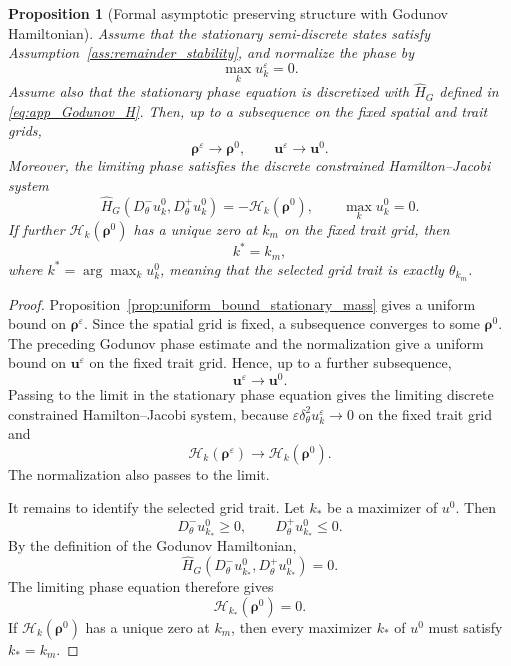 \documentclass[11pt]{article}
\newtheorem{proposition}{Proposition}[section]
\begin{document}
\begin{proposition}[Formal asymptotic preserving structure with Godunov Hamiltonian]
\label{prop:formal_asymptotic preserving_trait_selection}
Assume that the stationary semi-discrete states satisfy
Assumption~\ref{ass:remainder_stability}, and normalize the phase by
\[
    \max_k u_k^\varepsilon=0 .
\]
Assume also that the stationary phase equation is discretized with
\(\widehat H_G\) defined in \eqref{eq:app_Godunov_H}.  Then, up to a subsequence on
the fixed spatial and trait grids,
\[
    \boldsymbol\rho^\varepsilon\to \boldsymbol\rho^0,
    \qquad
    \boldsymbol u^\varepsilon\to \boldsymbol u^0 .
\]
Moreover, the limiting phase satisfies the discrete constrained
Hamilton--Jacobi system
\[
    \widehat H_G
    \left(
        D_\theta^-u_k^0,
        D_\theta^+u_k^0
    \right)
    =
    -\mathcal H_k(\boldsymbol\rho^0),
    \qquad
    \max_k u_k^0=0 .
\]
If further \(\mathcal H_k(\boldsymbol\rho^0)\) has a unique zero at
\(k_m\) on the fixed trait grid, then
\[
    k^*  = k_m,
\]
where $ k^* = \arg\max_k u_k^0$, meaning that the selected grid trait is exactly \(\theta_{k_m}\).
\end{proposition}

\begin{proof}
Proposition~\ref{prop:uniform_bound_stationary_mass} gives a uniform bound on
\(\boldsymbol\rho^\varepsilon\).  Since the spatial grid is fixed, a subsequence
converges to some \(\boldsymbol\rho^0\).  The preceding Godunov phase estimate
and the normalization give a uniform bound on \(\boldsymbol u^\varepsilon\) on
the fixed trait grid.  Hence, up to a further subsequence,
\[
    \boldsymbol u^\varepsilon\to \boldsymbol u^0 .
\]
Passing to the limit in the stationary phase equation gives the limiting
discrete constrained Hamilton--Jacobi system, because
\(\varepsilon\delta_\theta^2u_k^\varepsilon\to0\) on the fixed trait grid and
\[
    \mathcal H_k(\boldsymbol\rho^\varepsilon)
    \to
    \mathcal H_k(\boldsymbol\rho^0).
\]
The normalization also passes to the limit.

It remains to identify the selected grid trait.  Let \(k_*\) be a maximizer of
\(u^0\).  Then
\[
    D_\theta^-u_{k_*}^0\ge0,
    \qquad
    D_\theta^+u_{k_*}^0\le0 .
\]
By the definition of the Godunov Hamiltonian,
\[
    \widehat H_G
    \left(
        D_\theta^-u_{k_*}^0,
        D_\theta^+u_{k_*}^0
    \right)
    =
    0 .
\]
The limiting phase equation therefore gives
\[
    \mathcal H_{k_*}(\boldsymbol\rho^0)=0 .
\]
If \(\mathcal H_k(\boldsymbol\rho^0)\) has a unique zero at \(k_m\), then every
maximizer \(k_*\) of \(u^0\) must satisfy \(k_*=k_m\). 
\end{proof}
\end{document}
